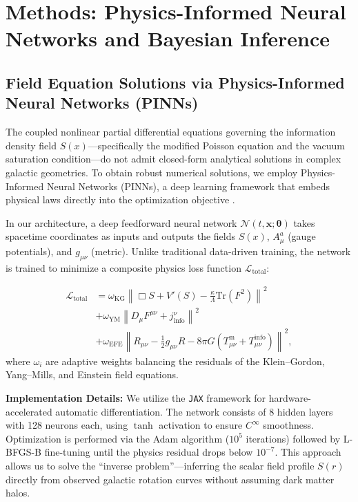 
\section{Methods: Physics-Informed Neural Networks and Bayesian Inference}
\label{sec:methods}

\subsection{Field Equation Solutions via Physics-Informed Neural Networks (PINNs)}
\label{subsec:pinn}

The coupled nonlinear partial differential equations governing the information density field $S(x)$---specifically the modified Poisson equation and the vacuum saturation condition---do not admit closed-form analytical solutions in complex galactic geometries. To obtain robust numerical solutions, we employ Physics-Informed Neural Networks (PINNs), a deep learning framework that embeds physical laws directly into the optimization objective \citep{Raissi2019}.

In our architecture, a deep feedforward neural network $\mathcal{N}(t, \mathbf{x}; \mathbf{\theta})$ takes spacetime coordinates as inputs and outputs the fields $S(x)$, $A_\mu^a$ (gauge potentials), and $g_{\mu\nu}$ (metric). Unlike traditional data-driven training, the network is trained to minimize a composite physics loss function $\mathcal{L}_{\mathrm{total}}$:

\begin{align}
\label{eq:pinn_loss}
\mathcal{L}_{\mathrm{total}} &= \omega_{\mathrm{KG}} \left\| \Box S + V'(S) - \frac{\kappa}{\Lambda} \mathrm{Tr}(F^2) \right\|^2 \nonumber \\
&+ \omega_{\mathrm{YM}} \left\| D_\mu F^{\mu\nu} + j^\nu_{\mathrm{info}} \right\|^2 \nonumber \\
&+ \omega_{\mathrm{EFE}} \left\| R_{\mu\nu} - \frac{1}{2}g_{\mu\nu}R - 8\pi G (T_{\mu\nu}^{\mathrm{m}} + T_{\mu\nu}^{\mathrm{info}}) \right\|^2,
\end{align}
where $\omega_i$ are adaptive weights balancing the residuals of the Klein--Gordon, Yang--Mills, and Einstein field equations.

\textbf{Implementation Details:} We utilize the \texttt{JAX} framework for hardware-accelerated automatic differentiation. The network consists of 8 hidden layers with 128 neurons each, using $\tanh$ activation to ensure $C^\infty$ smoothness. Optimization is performed via the Adam algorithm ($10^5$ iterations) followed by L-BFGS-B fine-tuning until the physics residual drops below $10^{-7}$. This approach allows us to solve the ``inverse problem''---inferring the scalar field profile $S(r)$ directly from observed galactic rotation curves without assuming dark matter halos.

